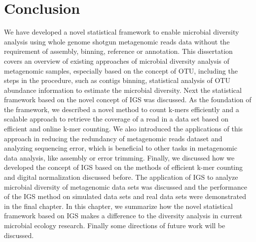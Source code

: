 %
%
%
%


\chapter{Conclusion}




We have developed a novel statistical framework to enable microbial diversity
 analysis using whole genome shotgun metagenomic reads data without the
requirement of assembly, binning, reference or annotation. This dissertation
covers an overview of existing approaches of microbial diversity analysis
 of metagenomic samples, especially based on the concept of OTU, including the
steps in the procedure, such as contigs binning, statistical
analysis of OTU abundance information to estimate the microbial diversity. Next
the statistical framework based on the novel concept of IGS was discussed. As
the foundation of the framework, we described a novel method to count k-mers
efficiently and a scalable approach to retrieve the coverage of a read in a 
data set based on efficient and online k-mer counting. We also introduced the
applications of this approach in reducing the redundancy of metagenomic reads
dataset and analyzing sequencing error, which is beneficial to other tasks 
in metagenomic data analysis, like
assembly or error trimming. Finally, we discussed how we developed the concept 
of IGS based on the methods of efficient k-mer counting and digital
normalization discussed before.  
The application of IGS to analyze microbial diversity of metagenomic data sets 
was discussed and the performance of the IGS method on simulated data sets and
real data sets were demonstrated in the final chapter. In this chapter, we
summarize how the novel statistical framework based on IGS makes a difference to
 the diversity analysis in current microbial ecology research. 
Finally some directions of future work will be discussed.


